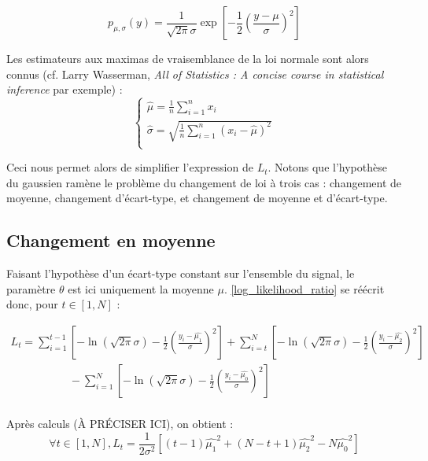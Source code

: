 \documentclass[french,12pt,notitlepage]{report}
\begin{document}
	\begin{equation*}
		p_{\mu, \sigma}(y) = \frac1{\sqrt{2 \pi} \sigma} \exp \left[ -\frac12 \left( \frac{y - \mu}{\sigma} \right)^2 \right]
	\end{equation*}

	Les estimateurs aux maximas de vraisemblance de la loi normale sont alors connus (cf. Larry Wasserman, \textit{All of Statistics : A concise course in statistical inference} par exemple) :
	\begin{equation}
	\left\{
	\begin{array}{ll}
		\hat{\mu} = \frac{1}{n} \sum_{i=1}^n x_i \\
		\hat{\sigma} = \sqrt{\frac{1}{n} \sum_{i=1}^n (x_i - \hat{\mu})^2} \\
	\end{array}
	\right.
	\label{estimators}
	\end{equation}

	Ceci nous permet alors de simplifier l'expression de $L_t$. Notons que l'hypothèse du gaussien ramène le problème du changement de loi à trois cas : changement de moyenne, changement d'écart-type, et changement de moyenne et d'écart-type.

	\subsection{Changement en moyenne}
	Faisant l'hypothèse d'un écart-type constant sur l'ensemble du signal, le paramètre $\theta$ est ici uniquement la moyenne $\mu$. \ref{log_likelihood_ratio} se réécrit donc, pour $t \in [1,N]$ :

	\begin{equation*}
	\begin{array}{ll}
		L_t = \sum_{i=1}^{t-1} \left[-\ln (\sqrt{2 \pi} \sigma)-\frac{1}{2}\left( \frac{y_i-\hat{\mu_1}}{\sigma} \right) ^2 \right] + \sum_{i=t}^{N} \left[-\ln (\sqrt{2 \pi} \sigma)-\frac{1}{2}\left( \frac{y_i-\hat{\mu_2}}{\sigma} \right) ^2 \right] \\
		~~~~~~~~~~~~~~~~~~~~~~~~ - \sum_{i=1}^{N} \left[-\ln (\sqrt{2 \pi} \sigma)-\frac{1}{2}\left( \frac{y_i-\hat{\mu_0}}{\sigma} \right) ^2 \right] \\
	\end{array}
	\end{equation*}

	Après calculs (À PRÉCISER ICI), on obtient :
	\begin{equation}
		\forall t \in [1, N], L_t = \frac{1}{2 \sigma ^2}\left[(t-1)\hat{\mu_1}^2 + (N - t + 1)\hat{\mu_2}^2 - N\hat{\mu_0}^2 \right]
		\label{meanchange}
	\end{equation}
\end{document}
